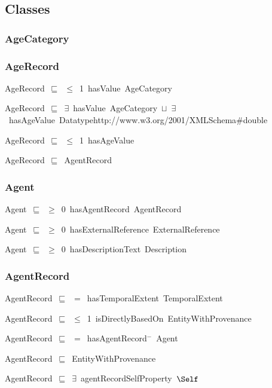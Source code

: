 \documentclass{article}
\begin{document}
\subsection*{Classes}

\subsubsection*{AgeCategory}

\subsubsection*{AgeRecord}

AgeRecord~\ensuremath{\sqsubseteq}~\ensuremath{\leq}~1~hasValue~AgeCategory~

AgeRecord~\ensuremath{\sqsubseteq}~\ensuremath{\exists}~hasValue~AgeCategory~\ensuremath{\sqcup}~\ensuremath{\exists}~hasAgeValue~Datatypehttp://www.w3.org/2001/XMLSchema#double~

AgeRecord~\ensuremath{\sqsubseteq}~\ensuremath{\leq}~1~hasAgeValue~

AgeRecord~\ensuremath{\sqsubseteq}~AgentRecord~

\subsubsection*{Agent}

Agent~\ensuremath{\sqsubseteq}~\ensuremath{\geq}~0~hasAgentRecord~AgentRecord~

Agent~\ensuremath{\sqsubseteq}~\ensuremath{\geq}~0~hasExternalReference~ExternalReference~

Agent~\ensuremath{\sqsubseteq}~\ensuremath{\geq}~0~hasDescriptionText~Description~

\subsubsection*{AgentRecord}

AgentRecord~\ensuremath{\sqsubseteq}~\ensuremath{=}~hasTemporalExtent~TemporalExtent~

AgentRecord~\ensuremath{\sqsubseteq}~\ensuremath{\leq}~1~isDirectlyBasedOn~EntityWithProvenance~

AgentRecord~\ensuremath{\sqsubseteq}~\ensuremath{=}~hasAgentRecord\ensuremath{^-}~Agent~

AgentRecord~\ensuremath{\sqsubseteq}~EntityWithProvenance~

AgentRecord~\ensuremath{\sqsubseteq}~\ensuremath{\exists}~agentRecordSelfProperty~\ensuremath{\Self}~
\end{document}
